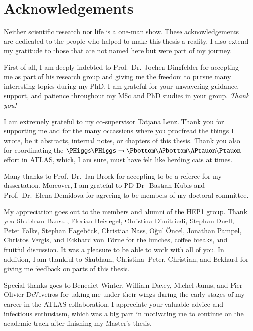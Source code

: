 \chapter*{Acknowledgements}

Neither scientific research nor life is a one-man show. These acknowledgements
are dedicated to the people who helped to make this thesis a reality. I also
extend my gratitude to those that are not named here but were part of my
journey.

First of all, I am deeply indebted to Prof.\ Dr.\ Jochen Dingfelder for
accepting me as part of his research group and giving me the freedom to pursue
many interesting topics during my PhD. I am grateful for your unwavering
guidance, support, and patience throughout my MSc and PhD studies in your
group. \emph{Thank you!}

I am extremely grateful to my co-supervisor Tatjana Lenz. Thank you for
supporting me and for the many occassions where you proofread the things I
wrote, be it abstracts, internal notes, or chapters of this thesis. Thank you
also for coordinating the $\HH \to \bbtautau$ effort in ATLAS, which, I am sure,
must have felt like herding cats at times.

Many thanks to Prof.\ Dr.\ Ian Brock for accepting to be a referee for my
dissertation. Moreover, I am grateful to PD Dr.\ Bastian Kubis and Prof.\ Dr.\
Elena Demidova for agreeing to be members of my doctoral committee.

My appreciation goes out to the members and alumni of the \textsc{HEP1}
group. Thank you Shubham Bansal, Florian Beisiegel, Christina Dimitriadi,
Stephan Duell, Peter Falke, Stephan Hageböck, Christian Nass, Oğul Öncel,
Jonathan Pampel, Christos Vergis, and Eckhard von Törne for the lunches, coffee
breaks, and fruitful discussion. It was a pleasure to be able to work with all
of you. In addition, I am thankful to Shubham, Christina, Peter, Christian, and
Eckhard for giving me feedback on parts of this thesis.

Special thanks goes to Benedict Winter, William Davey, Michel Janus, and
Pier-Olivier DeViveiros for taking me under their wings during the early stages
of my career in the ATLAS collaboration. I appreciate your valuable advice and
infectious enthusiasm, which was a big part in motivating me to continue on the
academic track after finishing my Master's thesis.

